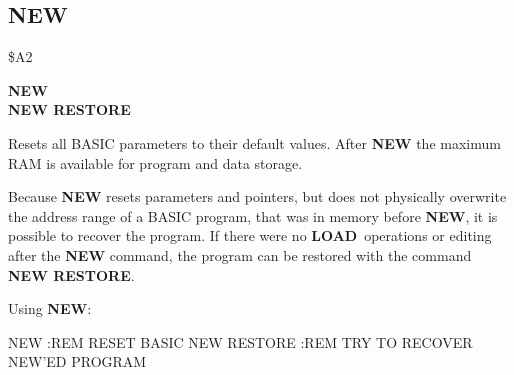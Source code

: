 
\newpage
\subsection{NEW}
\begin{description}[leftmargin=3cm,style=nextline]
\item [Token:] \$A2
\item [Format:] {\bf NEW} \\
                {\bf NEW RESTORE}
\item [Usage:]  Resets all BASIC parameters
                to their default values.
                After {\bf NEW} the maximum RAM is available
                for program and data storage.

                Because {\bf NEW} resets parameters and pointers,
                but does not physically overwrite the address
                range of a BASIC program, that was in memory
                before {\bf NEW}, it is possible to recover the
                program. If there were no {\bf LOAD} operations
                or editing after the {\bf NEW} command, the program
                can be restored with the command \\
                {\bf NEW RESTORE}.
\item [Example:] Using {\bf NEW}:
\begin{screenoutput}
 NEW         :REM RESET BASIC
 NEW RESTORE :REM TRY TO RECOVER NEW'ED PROGRAM
\end{screenoutput}
\end{description}


\newpage
